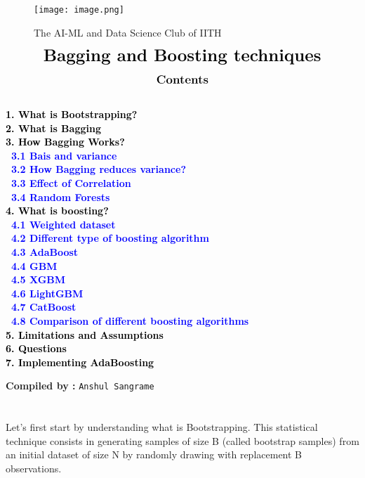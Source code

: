 \documentclass{homework}
\begin{document}
\begin{center}
\begin{figure}[h]
\centering
\texttt{[image: image.png]}
\caption*{{{\selectfont The AI-ML and Data Science Club of IITH}}}
\end{figure}
\end{center}
\begin{align*}
{\LARGE{\textbf{Bagging and Boosting techniques}}}
\end{align*}
\graphicspath{{./media/}}
\begin{align*}
\large{\textbf{{Contents}}}
\end{align*}
{\textcolor{black}{\textbf{
 \\
 1. {What is Bootstrapping?}\\
 2. {What is Bagging}\\
 3. {How Bagging Works?}\\
\indent \    \textcolor{blue}{3.1 Bais and variance}\\
\indent \    \textcolor{blue}{3.2 How Bagging reduces variance?}\\
\indent \    \textcolor{blue}{3.3 Effect of Correlation}\\
\indent \    \textcolor{blue}{3.4 Random Forests}\\
 4. {What is boosting?}\\
\indent \  \textcolor{blue}{4.1 Weighted dataset}\\
\indent \  \textcolor{blue}{4.2 Different type of boosting algorithm}\\
\indent \  \textcolor{blue}{4.3 AdaBoost}\\
\indent \  \textcolor{blue}{4.4 GBM}\\
\indent \  \textcolor{blue}{4.5 XGBM}\\
\indent \  \textcolor{blue}{4.6 LightGBM}\\
\indent \  \textcolor{blue}{4.7 CatBoost}\\
\indent \  \textcolor{blue}{4.8 Comparison of different boosting algorithms}\\
5. {Limitations and Assumptions}\\
6. {Questions}\\
7. {Implementing AdaBoosting}\\}}}
\begin{center}
    {\textbf{Compiled by :}
    \texttt{Anshul Sangrame}}
\end{center}

\newpage
\section{}
Let's first start by understanding what is Bootstrapping. This statistical technique consists in generating samples of size B (called bootstrap samples) from an initial dataset of size N by randomly drawing with replacement B observations.
\end{document}
